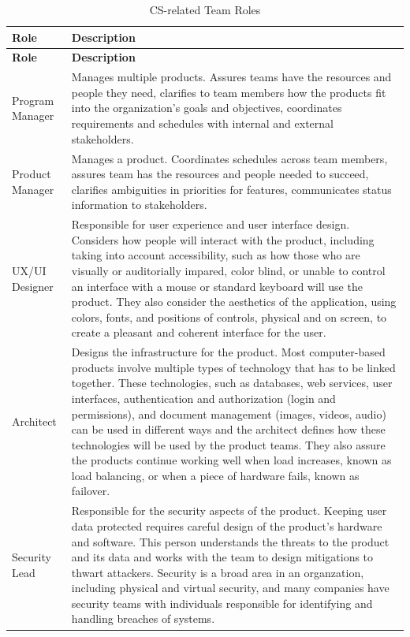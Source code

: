 \newcommand\Tstrut{\rule{0pt}{15pt}}  %


\begin{longtable}[!htb]{p{.8in}|p{3.6in}}
	\caption{CS-related Team Roles}
	\label{tab:table1}\\
	\textbf{Role} & \textbf{Description}\\
	\hline
	\endfirsthead
	\textbf{Role} & \textbf{Description}\\
	\endhead
	\Tstrut Program Manager & Manages multiple products. Assures teams have the resources and people they need, clarifies to team members how the products fit into the organization's goals and objectives, coordinates requirements and schedules with internal and external stakeholders.\\
	\hline
	\Tstrut Product Manager & Manages a product. Coordinates schedules across team members, assures team has the resources and people needed to succeed, clarifies ambiguities in priorities for features, communicates status information to stakeholders.\\
	\hline
	\Tstrut UX/UI \linebreak Designer & Responsible for user experience and user interface design. Considers how people will interact with the product, including taking into account accessibility, such as how those who are visually or auditorially impared, color blind, or unable to control an interface with a mouse or standard keyboard will use the product. They also consider the aesthetics of the application, using colors, fonts, and positions of controls, physical and on screen, to create a pleasant and coherent interface for the user.\\
	\hline
	\Tstrut Architect & Designs the infrastructure for the product. Most computer-based products involve multiple types of technology that has to be linked together. These technologies, such as databases, web services, user interfaces, authentication and authorization (login and permissions), and document management (images, videos, audio) can be used in different ways and the architect defines how these technologies will be used by the product teams. They also assure the products continue working well when load increases, known as load balancing, or when a piece of hardware fails, known as failover.\\
	\hline
	\Tstrut Security Lead & Responsible for the security aspects of the product. Keeping user data protected requires careful design of the product's hardware and software. This person understands the threats to the product and its data and works with the team to design mitigations to thwart attackers. Security is a broad area in an organzation, including physical and virtual security, and many companies have security teams with individuals responsible for identifying and handling breaches of systems.\\

\end{longtable}
